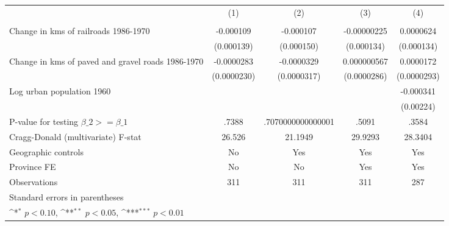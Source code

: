 {
\def\sym#1{\ifmmode^{#1}\else\(^{#1}\)\fi}
\begin{tabular}{l*{4}{c}}
\hline\hline
                &\multicolumn{1}{c}{(1)}&\multicolumn{1}{c}{(2)}&\multicolumn{1}{c}{(3)}&\multicolumn{1}{c}{(4)}\\
                &\multicolumn{1}{c}{}&\multicolumn{1}{c}{}&\multicolumn{1}{c}{}&\multicolumn{1}{c}{}\\
\hline
Change in kms of railroads 1986-1970&-0.000109         &-0.000107         &-0.00000225         &0.0000624         \\
                &(0.000139)         &(0.000150)         &(0.000134)         &(0.000134)         \\
[1em]
Change in kms of paved and gravel roads 1986-1970&-0.0000283         &-0.0000329         &0.000000567         &0.0000172         \\
                &(0.0000230)         &(0.0000317)         &(0.0000286)         &(0.0000293)         \\
[1em]
Log urban population 1960&                  &                  &                  &-0.000341         \\
                &                  &                  &                  &(0.00224)         \\
\hline
P-value for testing $\beta\_{2} >= \beta\_{1}$&    .7388         &.7070000000000001         &    .5091         &    .3584         \\
Cragg-Donald (multivariate) F-stat&   26.526         &  21.1949         &  29.9293         &  28.3404         \\
Geographic controls&       No         &      Yes         &      Yes         &      Yes         \\
Province FE     &       No         &       No         &      Yes         &      Yes         \\
Observations    &      311         &      311         &      311         &      287         \\
\hline\hline
\multicolumn{5}{l}{\footnotesize Standard errors in parentheses}\\
\multicolumn{5}{l}{\footnotesize \sym{*} \(p<0.10\), \sym{**} \(p<0.05\), \sym{***} \(p<0.01\)}\\
\end{tabular}
}
